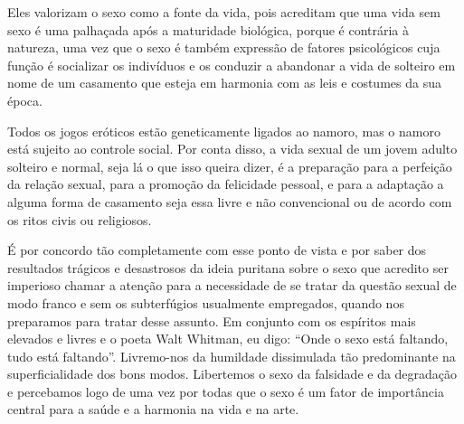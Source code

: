 Eles valorizam o sexo como a fonte da vida, pois acreditam que uma vida
sem sexo é uma palhaçada após a maturidade biológica, porque é contrária
à natureza, uma vez que o sexo é também expressão de fatores
psicológicos cuja função é socializar os indivíduos e os conduzir a
abandonar a vida de solteiro em nome de um casamento que esteja em
harmonia com as leis e costumes da sua época.

Todos os jogos eróticos estão geneticamente ligados ao namoro, mas o
namoro está sujeito ao controle social. Por conta disso, a vida sexual
de um jovem adulto solteiro e normal, seja lá o que isso queira dizer, é
a preparação para a perfeição da relação sexual, para a promoção da
felicidade pessoal, e para a adaptação a alguma forma de casamento seja
essa livre e não convencional ou de acordo com os ritos civis ou
religiosos.

É por concordo tão completamente com esse ponto de vista e por saber dos
resultados trágicos e desastrosos da ideia puritana sobre o sexo que
acredito ser imperioso chamar a atenção para a necessidade de se tratar
da questão sexual de modo franco e sem os subterfúgios usualmente
empregados, quando nos preparamos para tratar desse assunto. Em conjunto
com os espíritos mais elevados e livres e o poeta Walt Whitman, eu digo:
``Onde o sexo está faltando, tudo está faltando''. Livremo-nos da
humildade dissimulada tão predominante na superficialidade dos bons
modos. Libertemos o sexo da falsidade e da degradação e percebamos logo
de uma vez por todas que o sexo é um fator de importância central para a
saúde e a harmonia na vida e na arte.
